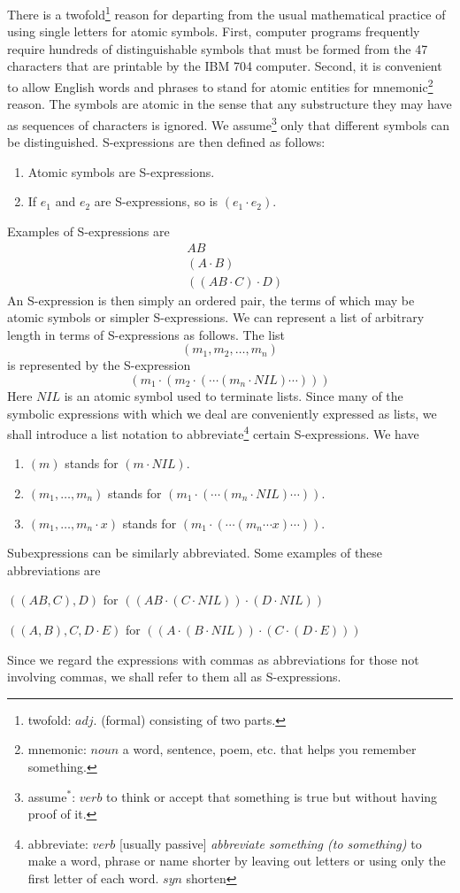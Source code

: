 \documentclass[11pt, a4paper]{article}
\begin{document}
There is a
twofold\footnote{twofold: $adj.$ (formal) consisting of two parts.}
reason for departing from the usual mathematical practice of
using single letters for atomic symbols. First, computer programs frequently
require hundreds of distinguishable symbols that must be formed from the 47
characters that are printable by the IBM 704 computer. Second, it is convenient
to allow English words and phrases to stand for atomic entities for
mnemonic\footnote{mnemonic: $noun$ a word, sentence, poem, etc. that helps you
  remember something.}
reason. The symbols are atomic in the sense that any substructure they may have
as sequences of characters is ignored. We
assume\footnote{assume$^*$: $verb$ to think or accept that something is true but
  without having proof of it.}
only that different symbols can
be distinguished. S-expressions are then defined as follows:
\begin{enumerate}
\item Atomic symbols are S-expressions.
\item If $e_1$ and $e_2$ are S-expressions, so is $(e_1 \cdot e_2)$.
\end{enumerate}
Examples of S-expressions are
\begin{align*}
&AB          \\
&(A \cdot B) \\
&((AB \cdot C) \cdot D)
\end{align*}
An S-expression is then simply an ordered pair, the terms of which may be atomic
symbols or simpler S-expressions. We can represent a list of arbitrary length in
terms of S-expressions as follows. The list
$$ (m_1, m_2, \ldots, m_n) $$
is represented by the S-expression
$$ (m_1 \cdot (m_2 \cdot ( \cdots (m_n \cdot NIL) \cdots ))) $$
Here $NIL$ is an atomic symbol used to terminate lists. Since many of the
symbolic expressions with which we deal are conveniently expressed as lists, we
shall introduce a list notation to
abbreviate\footnote{abbreviate: $verb$ [usually passive] \textit{abbreviate
    something (to something)} to make a word, phrase or name shorter by leaving
  out letters or using only the first letter of each word. $syn$ shorten}
certain S-expressions. We have
\begin{enumerate}
\item $(m)$ stands for $(m \cdot NIL)$.
\item $(m_1, \ldots, m_n)$ stands for
  $(m_1 \cdot ( \cdots (m_n \cdot NIL) \cdots ))$.
\item $(m_1, \ldots, m_n \cdot x)$ stands for
  $(m_1 \cdot ( \cdots (m_n \cdots x) \cdots ))$.
\end{enumerate}

Subexpressions can be similarly abbreviated. Some examples of these
abbreviations are
\begin{center}
  $((AB, C), D)$ for $((AB \cdot (C \cdot NIL)) \cdot (D \cdot NIL))$
\end{center}
\begin{center}
  $((A, B), C, D \cdot E)$ for
  $((A \cdot (B \cdot NIL)) \cdot (C \cdot (D \cdot E)))$
\end{center}

Since we regard the expressions with commas as abbreviations for those not
involving commas, we shall refer to them all as S-expressions.
\end{document}
